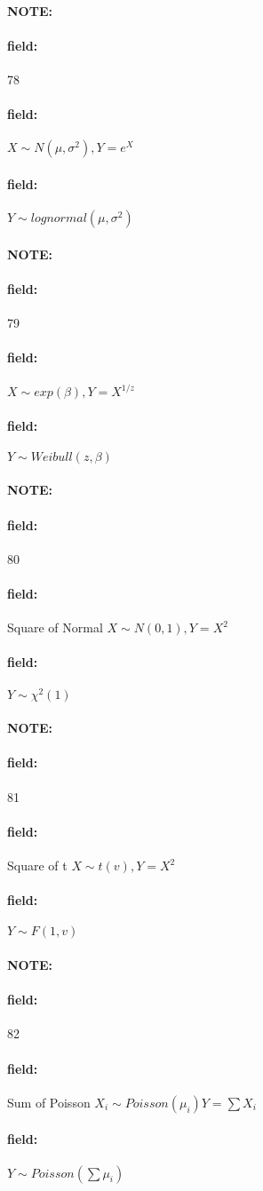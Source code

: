 \documentclass[12pt]{article}
\newenvironment{note}{\paragraph{NOTE:}}{}
\newenvironment{field}{\paragraph{field:}}{}
\begin{document}
\begin{note} \begin{field} \tiny 78 \end{field}
  \begin{field}
    $X \sim N(\mu,\sigma^2), Y = e^X$
  \end{field}
  \begin{field}
    $Y \sim lognormal(\mu,\sigma^2)$
  \end{field}
\end{note}

\begin{note} \begin{field} \tiny 79 \end{field}
  \begin{field}
    $X \sim exp(\beta), Y = X^{1/z}$
  \end{field}
  \begin{field}
    $Y \sim Weibull(z,\beta)$
  \end{field}
\end{note}

\begin{note} \begin{field} \tiny 80 \end{field}
  \begin{field}
    Square of Normal
    $X \sim N(0,1), Y = X^2$
  \end{field}
  \begin{field}
    $Y \sim \chi^2(1)$
  \end{field}
\end{note}

\begin{note} \begin{field} \tiny 81 \end{field}
  \begin{field}
    Square of t
    $X \sim t(v), Y = X^2$
  \end{field}
  \begin{field}
    $Y \sim F(1,v)$
  \end{field}
\end{note}

\begin{note} \begin{field} \tiny 82 \end{field}
  \begin{field}
    Sum of Poisson
    $X_i \sim Poisson(\mu_i) Y = \sum X_i$
  \end{field}
  \begin{field}
    $Y \sim Poisson(\sum \mu_i)$
  \end{field}
\end{note}
\end{document}
